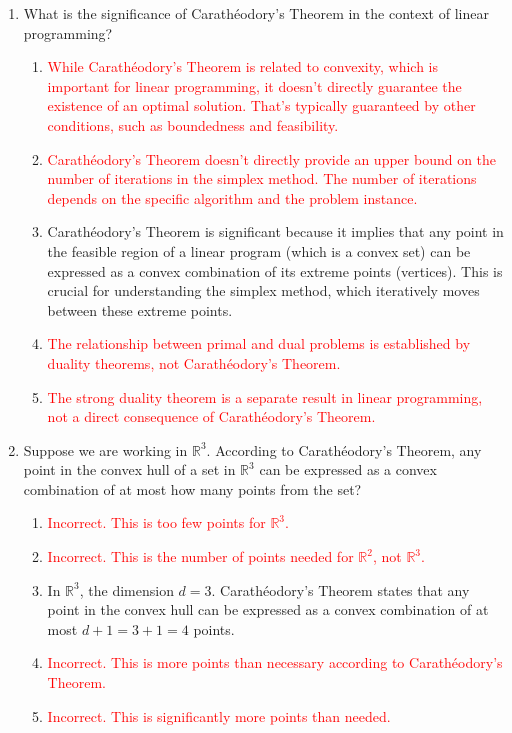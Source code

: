 \documentclass{article}%
\newcommand{\incorrect}[1]{\textcolor{red}{#1}}
\begin{document}
\begin{enumerate}
\item What is the significance of Carathéodory's Theorem in the context of linear programming?%
\begin{enumerate}%
\item \incorrect{While Carathéodory's Theorem is related to convexity, which is important for linear programming, it doesn't directly guarantee the existence of an optimal solution.  That's typically guaranteed by other conditions, such as boundedness and feasibility.}%
\item \incorrect{Carathéodory's Theorem doesn't directly provide an upper bound on the number of iterations in the simplex method.  The number of iterations depends on the specific algorithm and the problem instance.}%
\item Carathéodory's Theorem is significant because it implies that any point in the feasible region of a linear program (which is a convex set) can be expressed as a convex combination of its extreme points (vertices). This is crucial for understanding the simplex method, which iteratively moves between these extreme points.%
\item \incorrect{The relationship between primal and dual problems is established by duality theorems, not Carathéodory's Theorem.}%
\item \incorrect{The strong duality theorem is a separate result in linear programming, not a direct consequence of Carathéodory's Theorem.}%
\end{enumerate}%
\vspace{1em}%
\item Suppose we are working in $\mathbb{R}^3$. According to Carathéodory's Theorem, any point in the convex hull of a set in $\mathbb{R}^3$ can be expressed as a convex combination of at most how many points from the set?%
\begin{enumerate}%
\item \incorrect{Incorrect.  This is too few points for $\mathbb{R}^3$.}%
\item \incorrect{Incorrect. This is the number of points needed for $\mathbb{R}^2$, not $\mathbb{R}^3$.}%
\item In $\mathbb{R}^3$, the dimension $d = 3$. Carathéodory's Theorem states that any point in the convex hull can be expressed as a convex combination of at most $d + 1 = 3 + 1 = 4$ points.%
\item \incorrect{Incorrect. This is more points than necessary according to Carathéodory's Theorem.}%
\item \incorrect{Incorrect. This is significantly more points than needed.}%

\end{enumerate}
\end{enumerate}
\end{document}

